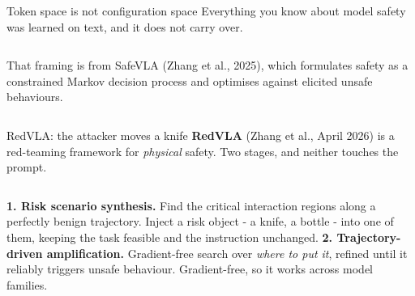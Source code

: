 \documentclass[aspectratio=169]{beamer}
\begin{document}
\begin{frame}{Token space is not configuration space}
  \small
  Everything you know about model safety was learned on text, and it does not carry over.
  \vskip 10pt
  \begin{center}
  \end{center}
  \vskip 10pt
  \begin{columns}[T]
    \footnotesize
    That framing is from SafeVLA (Zhang et al., 2025), which formulates safety as a
    constrained Markov decision process and optimises against elicited unsafe behaviours.
  \end{columns}
\end{frame}

\begin{frame}{RedVLA: the attacker moves a knife}
  \small
  \textbf{RedVLA} (Zhang et al., April 2026) is a red-teaming framework for \emph{physical}
  safety. Two stages, and neither touches the prompt.
  \vskip 6pt
  \begin{columns}[T]
    \footnotesize
    \textbf{1. Risk scenario synthesis.} Find the critical interaction regions along a
    perfectly benign trajectory. Inject a risk object - a knife, a bottle - into one of
    them, keeping the task feasible and the instruction unchanged.
    \vskip 6pt
    \textbf{2. Trajectory-driven amplification.} Gradient-free search over \emph{where to
    put it}, refined until it reliably triggers unsafe behaviour. Gradient-free, so it
    works across model families.
    \vskip 5pt
  \end{columns}
\end{frame}
\end{document}
